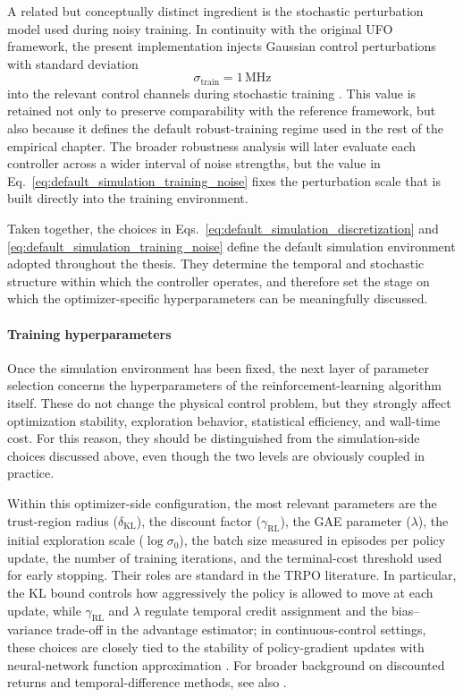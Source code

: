 A related but conceptually distinct ingredient is the stochastic perturbation model used during noisy training. In continuity with the original UFO framework, the present implementation injects Gaussian control perturbations with standard deviation
\begin{equation}
\sigma_{\mathrm{train}} = 1\,\mathrm{MHz}
\label{eq:default_simulation_training_noise}
\end{equation}
into the relevant control channels during stochastic training \cite{Niu2019}. This value is retained not only to preserve comparability with the reference framework, but also because it defines the default robust-training regime used in the rest of the empirical chapter. The broader robustness analysis will later evaluate each controller across a wider interval of noise strengths, but the value in Eq.~\eqref{eq:default_simulation_training_noise} fixes the perturbation scale that is built directly into the training environment.

Taken together, the choices in Eqs.~\eqref{eq:default_simulation_discretization} and \eqref{eq:default_simulation_training_noise} define the default simulation environment adopted throughout the thesis. They determine the temporal and stochastic structure within which the controller operates, and therefore set the stage on which the optimizer-specific hyperparameters can be meaningfully discussed.

\paragraph{Training hyperparameters}
\label{subsec:training_hyperparameters}

Once the simulation environment has been fixed, the next layer of parameter selection concerns the hyperparameters of the reinforcement-learning algorithm itself. These do not change the physical control problem, but they strongly affect optimization stability, exploration behavior, statistical efficiency, and wall-time cost. For this reason, they should be distinguished from the simulation-side choices discussed above, even though the two levels are obviously coupled in practice.

Within this optimizer-side configuration, the most relevant parameters are the trust-region radius (\(\delta_{\mathrm{KL}}\)), the discount factor (\(\gamma_{\mathrm{RL}}\)), the GAE parameter (\(\lambda\)), the initial exploration scale (\(\log \sigma_0\)), the batch size measured in episodes per policy update, the number of training iterations, and the terminal-cost threshold used for early stopping. Their roles are standard in the TRPO literature. In particular, the KL bound controls how aggressively the policy is allowed to move at each update, while \(\gamma_{\mathrm{RL}}\) and \(\lambda\) regulate temporal credit assignment and the bias--variance trade-off in the advantage estimator; in continuous-control settings, these choices are closely tied to the stability of policy-gradient updates with neural-network function approximation \cite{Schulman2015,Schulman2016GAE}. For broader background on discounted returns and temporal-difference methods, see also \cite{SuttonBarto2018}.

